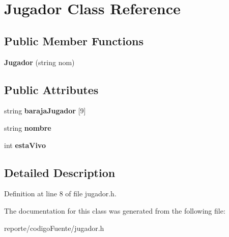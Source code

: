 \hypertarget{class_jugador}{}\section{Jugador Class Reference}
\label{class_jugador}
\subsection*{Public Member Functions}
\begin{DoxyCompactItemize}
\item 
\mbox{\label{class_jugador_a416451520449462f311e4bc397dd4b31}} 
{\bfseries Jugador} (string nom)
\end{DoxyCompactItemize}
\subsection*{Public Attributes}
\begin{DoxyCompactItemize}
\item 
\mbox{\label{class_jugador_ab45a9d5900e1f695391f7802d4ce5cfc}} 
string {\bfseries baraja\+Jugador} \mbox{[}9\mbox{]}
\item 
\mbox{\label{class_jugador_ae173555c513c4267f92c915e94c7e524}} 
string {\bfseries nombre}
\item 
\mbox{\label{class_jugador_afb8bac5a28f3c7ef4f925362a58d8a63}} 
int {\bfseries esta\+Vivo}
\end{DoxyCompactItemize}


\subsection{Detailed Description}


Definition at line 8 of file jugador.\+h.



The documentation for this class was generated from the following file\+:\begin{DoxyCompactItemize}
\item 
reporte/codigo\+Fuente/jugador.\+h\end{DoxyCompactItemize}
